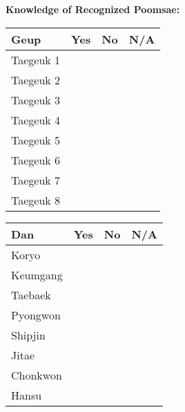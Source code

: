 \documentclass[10pt]{article}
\begin{document}
\begin{center}
    \vspace{0.02\textwidth}

    \textbf{\Large Knowledge of Recognized Poomsae:}
    \vspace{0.02\textwidth}

    \begin{minipage}{0.45\textwidth}
        \begin{tabular}{|p{}|C{0.1\textwidth}|C{0.1\textwidth}|C{0.1\textwidth}|}
            \hline
            \textbf{Geup} & \textbf{Yes} & \textbf{No} & \textbf{N/A} \\ \hline
            Taegeuk 1 & & & \\ \hline
            Taegeuk 2 & & & \\ \hline
            Taegeuk 3 & & & \\ \hline
            Taegeuk 4 & & & \\ \hline
            Taegeuk 5 & & & \\ \hline
            Taegeuk 6 & & & \\ \hline
            Taegeuk 7 & & & \\ \hline
            Taegeuk 8 & & & \\ \hline
        \end{tabular}
    \end{minipage}
    \begin{minipage}{0.45\textwidth}
        \begin{tabular}{|p{}|C{0.1\textwidth}|C{0.1\textwidth}|C{0.1\textwidth}|}
            \hline
            \textbf{Dan} & \textbf{Yes} & \textbf{No} & \textbf{N/A} \\ \hline
            Koryo & & & \\ \hline
            Keumgang & & & \\ \hline
            Taebaek & & & \\ \hline
            Pyongwon & & & \\ \hline
            Shipjin & & & \\ \hline
            Jitae & & & \\ \hline
            Chonkwon & & & \\ \hline
            Hansu & & & \\ \hline
        \end{tabular}
    \end{minipage}



\end{center}
\end{document}

